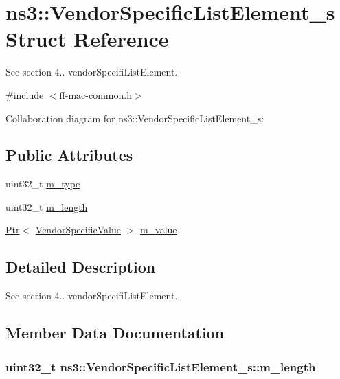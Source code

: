 \hypertarget{structns3_1_1VendorSpecificListElement__s}{}\section{ns3\+:\+:Vendor\+Specific\+List\+Element\+\_\+s Struct Reference}
\label{structns3_1_1VendorSpecificListElement__s}


See section 4.. vendor\+Specifi\+List\+Element.  




{\ttfamily \#include $<$ff-\/mac-\/common.\+h$>$}



Collaboration diagram for ns3\+:\+:Vendor\+Specific\+List\+Element\+\_\+s\+:
\subsection*{Public Attributes}
\begin{DoxyCompactItemize}
\item 
uint32\+\_\+t \hyperlink{structns3_1_1VendorSpecificListElement__s_a146ac096a51f0b436fbc7b68a57c9146}{m\+\_\+type}
\item 
uint32\+\_\+t \hyperlink{structns3_1_1VendorSpecificListElement__s_a654a0532ff6f7a471f326f3b1c11ec61}{m\+\_\+length}
\item 
\hyperlink{classns3_1_1Ptr}{Ptr}$<$ \hyperlink{structns3_1_1VendorSpecificValue}{Vendor\+Specific\+Value} $>$ \hyperlink{structns3_1_1VendorSpecificListElement__s_acfc2eb2018307aaa0f20653b66240566}{m\+\_\+value}
\end{DoxyCompactItemize}


\subsection{Detailed Description}
See section 4.. vendor\+Specifi\+List\+Element. 

\subsection{Member Data Documentation}
\subsubsection[{\texorpdfstring{m\+\_\+length}{m_length}}]{\setlength{\rightskip}{0pt plus 5cm}uint32\+\_\+t ns3\+::\+Vendor\+Specific\+List\+Element\+\_\+s\+::m\+\_\+length}\hypertarget{structns3_1_1VendorSpecificListElement__s_a654a0532ff6f7a471f326f3b1c11ec61}{}\label{structns3_1_1VendorSpecificListElement__s_a654a0532ff6f7a471f326f3b1c11ec61}
